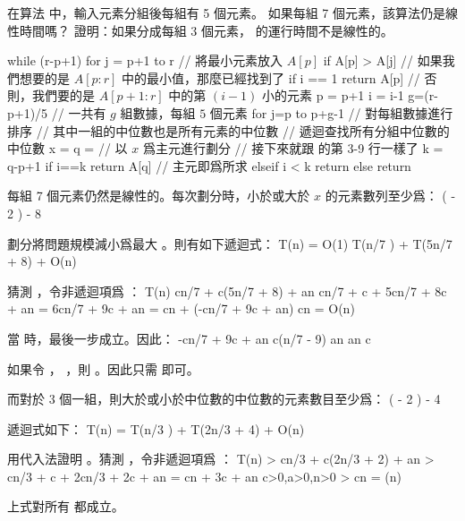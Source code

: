 
\startEXERCISE[exercise:9_3_1]
在算法  中，輸入元素分組後每組有 5 個元素。
如果每組 7 個元素，該算法仍是線性時間嗎？
證明：如果分成每組 3 個元素，  的運行時間不是線性的。

\startCLRSCODE
while (r-p+1)  
	for j = p+1 to r	// 將最小元素放入 $A[p]$
		if A[p] > A[j]
	// 如果我們想要的是 $A[p:r]$ 中的最小值，那麼已經找到了
	if i == 1
		return A[p]
	// 否則，我們要的是 $A[p+1:r]$ 中的第 $(i-1)$ 小的元素
	p = p+1
	i = i-1
g=(r-p+1)/5	// 一共有 $g$ 組數據，每組 $5$ 個元素
for j=p to p+g-1	// 對每組數據進行排序
// 其中一組的中位數也是所有元素的中位數
// 遞迴查找所有分組中位數的中位數
x = 
q = 	// 以 $x$ 爲主元進行劃分
// 接下來就跟  的第 3-9 行一樣了
k = q-p+1
if i==k
	return A[q]	// 主元即爲所求
elseif i < k
	return 
else
	return 
\stopCLRSCODE
\stopEXERCISE

\startANSWER
每組 7 個元素仍然是線性的。每次劃分時，小於或大於 $x$ 的元素數列至少爲：
 \left(\left\lceil {} \left\lceil {} \right\rceil \right\rceil
           - 2 \right) \ge {} - 8
\stopformula

劃分將問題規模減小爲最大 。則有如下遞迴式：
\startformula
T(n) = \startmathcases
 \NC O(1) \NC {} \NR
 \NC T(\lceil n/7 \rceil) + T(5n/7 + 8) + O(n) \NC {} \NR
\stopmathcases
\stopformula

猜測 ，令非遞迴項爲 ：
\startsplitformula\startmathalignment
\NC T(n) \NC \le c\lceil n/7 \rceil + c(5n/7 + 8) + an \NR
\NC \NC \le cn/7 + c + 5cn/7 + 8c + an \NR
\NC \NC = 6cn/7 + 9c + an \NR
\NC \NC = cn + (-cn/7 + 9c + an) \NR
\NC \NC \le cn \NR
\NC \NC = O(n) \NR
\stopmathalignment\stopsplitformula

當  時，最後一步成立。因此：
\startsplitformula\startmathalignment[n=1]
\NC -cn/7 + 9c + an  \NR
\NC \Downarrow \NR
\NC c(n/7 - 9) \ge an \NR
\NC \Downarrow \NR
\NC {} \ge an \NR
\NC \Downarrow \NR
\NC c \ge {} \NR
\stopmathalignment\stopsplitformula

如果令 ， ，則 。因此只需  即可。

而對於 3 個一組，則大於或小於中位數的中位數的元素數目至少爲：
 \left(\left\lceil {} \left\lceil {} \right\rceil \right\rceil
           - 2 \right) \ge {} - 4
\stopformula

遞迴式如下：
\startformula
T(n) = T(\lceil n/3 \rceil) + T(2n/3 + 4) + O(n)
\stopformula

用代入法證明 。猜測 ，令非遞迴項爲 ：
\startsplitformula\startmathalignment
\NC T(n) \NC > c\lceil n/3 \rceil + c(2n/3 + 2) + an \NR
\NC \NC > cn/3 + c + 2cn/3 + 2c + an \NR
\NC \NC = cn + 3c + an \qquad c>0,a>0,n>0\NR
\NC \NC > cn \NR
\NC \NC = \omega(n) \NR
\stopmathalignment\stopsplitformula

上式對所有  都成立。
\stopANSWER
